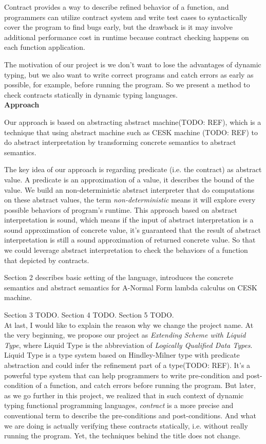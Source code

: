 \documentclass[paper=a4, fontsize=11pt]{scrartcl} %
\numberwithin{equation}{section} %
\numberwithin{figure}{section} %
\numberwithin{table}{section} %
\begin{document}
Contract provides a way to describe refined behavior of a function, and programmers can utilize contract system and write test cases to syntactically cover the program to find bugs early, but the drawback is it may involve additional performance cost in runtime because contract checking happens on each function application.

The motivation of our project is we don't want to lose the advantages of dynamic typing, but we also want to write correct programs and catch errors as early as possible, for example, before running the program. So we present a method to check contracts statically in dynamic typing languages. \\

\textbf{Approach}

Our approach is based on abstracting abstract machine(TODO: REF), which is a technique that using abstract machine such as CESK machine (TODO: REF) to do abstract interpretation by transforming concrete semantics to abstract semantics. 

The key idea of our approach is regarding predicate (i.e. the contract) as abstract value. A predicate is an approximation of a value, it describes the bound of the value. We build an non-deterministic abstract interpreter that do computations on these abstract values, the term \textit{non-deterministic} means it will explore every possible behaviors of program's runtime. This approach based on abstract interpretation is sound, which means if the input of abstract interpretation is a sound approximation of concrete value, it's guaranteed that the result of abstract interpretation is still a sound approximation of returned concrete value. So that we could leverage abstract interpretation to check the behaviors of a function that depicted by contracts.

Section 2 describes basic setting of the language, introduces the concrete semantics and abstract semantics for A-Normal Form lambda calculus on CESK machine.

Section 3 TODO. 
Section 4 TODO.
Section 5 TODO. \\

At last, I would like to explain the reason why we change the project name. At the very beginning, we propose our project as \textit{Extending Scheme with Liquid Type}, where Liquid Type is the abbreviation of \textit{Logically Qualified Data Types}. Liquid Type is a type system based on Hindley-Milner type with predicate abstraction and could infer the refinement part of a type(TODO: REF). It's a powerful type system that can help programmers to write pre-condition and post-condition of a function, and catch errors before running the program. But later, as we go further in this project, we realized that in such context of dynamic typing functional programming languages, \textit{contract} is a more precise and conventional term to describe the pre-conditions and post-conditions. And what we are doing is actually verifying these contracts statically, i.e. without really running the program. Yet, the techniques behind the title does not change.
\end{document}
